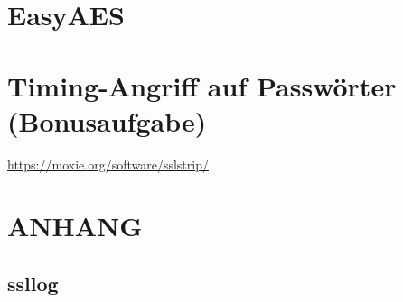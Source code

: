 \documentclass[twoside]{article}
\begin{document}
		
\section{EasyAES}
	\label{sec:easyaes}
	
	
\section{Timing-Angriff auf Passwörter (Bonusaufgabe)}
	\label{sec:timing}
		




\begin{thebibliography}{1}
	\url{https://moxie.org/software/sslstrip/}
\end{thebibliography}

\newpage
\section*{ANHANG}
	\label{sec:anhang}
	\subsection*{ssllog}
		\label{ssllog}
\end{document}
